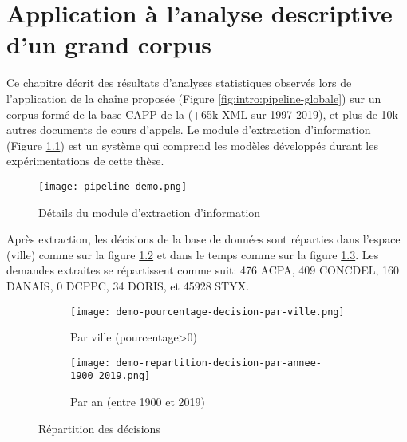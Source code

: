 \chapter{Application à l'analyse descriptive d'un grand corpus}
\label{chap:demo}
Ce chapitre décrit des résultats d'analyses statistiques observés lors de l'application de la chaîne proposée (Figure \ref{fig:intro:pipeline-globale}) sur un corpus formé de la base CAPP de la \citet{dila2019capp} (+65k XML sur 1997-2019), et plus de 10k autres documents de cours d'appels. Le module d'extraction d'information (Figure \ref{fig:demo:module-extraction}) est un système qui comprend les modèles développés durant les expérimentations de cette thèse. 



\begin{figure}[!htb]
	\centering 
	\texttt{[image: pipeline-demo.png]}
	\caption{Détails du module d'extraction d'information}\label{fig:demo:module-extraction}
\end{figure}

Après extraction, les décisions de la base de données sont réparties dans l'espace (ville) comme sur la figure \ref{fig:demo:doc-per-city} et dans le temps comme sur la figure \ref{fig:demo:doc-per-year}. Les demandes extraites se répartissent comme suit: 476 ACPA, 409 CONCDEL, 160 DANAIS, 0 DCPPC, 34 DORIS, et 45928 STYX.  

\begin{figure}[ht]
	\centering
	\begin{subfigure}[ht]{0.55\textwidth}
		\centering
		\centering
		\texttt{[image: demo-pourcentage-decision-par-ville.png]}
		\caption{Par ville (pourcentage>0)} \label{fig:demo:doc-per-city}
	\end{subfigure} 
	\begin{subfigure}[ht]{0.43\textwidth}
		\centering
		\texttt{[image: demo-repartition-decision-par-annee-1900\_2019.png]}
		\caption{Par an (entre 1900 et 2019)} \label{fig:demo:doc-per-year}
	\end{subfigure}
	\caption{Répartition des décisions} \label{fig:demo:docs-distribution-over-time-and-space}
\end{figure}


